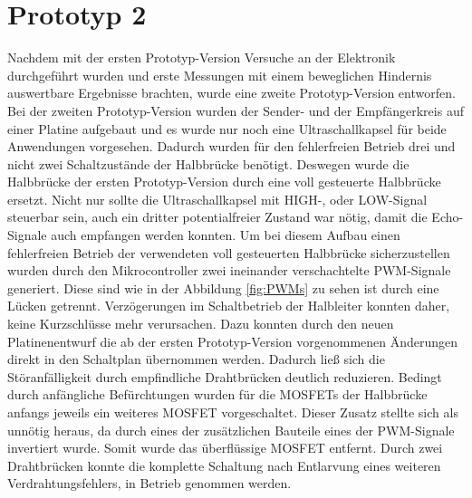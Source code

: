 \section{Prototyp 2}
Nachdem mit der ersten Prototyp-Version Versuche an der Elektronik durchgeführt wurden und erste Messungen mit einem beweglichen Hindernis auswertbare Ergebnisse brachten, wurde eine zweite Prototyp-Version entworfen. Bei der zweiten Prototyp-Version wurden der Sender- und der Empfängerkreis auf einer Platine aufgebaut und es wurde nur noch eine Ultraschallkapsel für beide Anwendungen vorgesehen. Dadurch wurden für den fehlerfreien Betrieb drei und nicht zwei Schaltzustände der Halbbrücke benötigt. Deswegen wurde die Halbbrücke der ersten Prototyp-Version durch eine voll gesteuerte Halbbrücke ersetzt. Nicht nur sollte die Ultraschallkapsel mit HIGH-, oder LOW-Signal steuerbar sein, auch ein dritter potentialfreier Zustand war nötig, damit die Echo-Signale auch empfangen werden konnten. Um bei diesem Aufbau einen fehlerfreien Betrieb der verwendeten voll gesteuerten Halbbrücke sicherzustellen wurden durch den Mikrocontroller zwei ineinander verschachtelte PWM-Signale generiert. Diese sind wie in der Abbildung \ref{fig:PWMs} zu sehen ist durch eine Lücken getrennt. Verzögerungen im Schaltbetrieb der Halbleiter konnten daher, keine Kurzschlüsse mehr verursachen. Dazu konnten durch den neuen Platinenentwurf die ab der ersten Prototyp-Version vorgenommenen Änderungen direkt in den Schaltplan übernommen werden. Dadurch ließ sich die Störanfälligkeit durch empfindliche Drahtbrücken deutlich reduzieren. Bedingt durch anfängliche Befürchtungen wurden für die MOSFETs der Halbbrücke anfangs jeweils ein weiteres MOSFET vorgeschaltet. Dieser Zusatz stellte sich als unnötig heraus, da durch eines der zusätzlichen Bauteile eines der PWM-Signale invertiert wurde. Somit wurde das überflüssige MOSFET entfernt. Durch zwei Drahtbrücken konnte die komplette Schaltung nach Entlarvung eines weiteren Verdrahtungsfehlers, in Betrieb genommen werden.\\
